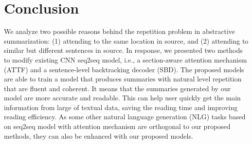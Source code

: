 \section{Conclusion}
\label{sec:conclude}
We analyze two possible reasons behind the repetition problem in abstractive
summarization: (1) attending to the same location in source,
and (2) attending to similar but different sentences in source. 
In response, 
we presented two methods to modify existing CNN seq2seq model, i.e.,
a section-aware attention mechanism (ATTF)
and a sentence-level backtracking decoder (SBD). 
The proposed models are able to train a model that produces 
summaries with natural level repetition that are fluent and coherent. 
It means that the summaries generated by our model are more accurate and 
readable. This can help user quickly get the main information from large of textual data,
saving the reading time and improving reading efficiency.
As some other natural language generation (NLG) tasks based on seq2seq model with attention mechanism
are orthogonal to our proposed methods,
they can also be enhanced with our proposed models.

